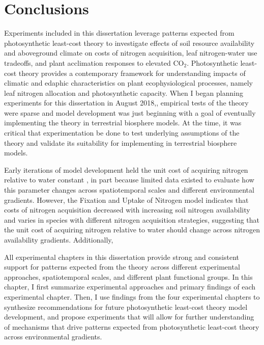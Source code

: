 \chapter{\textbf{Conclusions}}
Experiments included in this dissertation leverage patterns expected from photosynthetic least-cost theory to investigate effects of soil resource availability and aboveground climate on costs of nitrogen acquisition, leaf nitrogen-water use tradeoffs, and plant acclimation responses to elevated CO$_2$. Photosynthetic least-cost theory provides a contemporary framework for understanding impacts of climatic and edaphic characteristics on plant ecophysiological processes, namely leaf nitrogen allocation and photosynthetic capacity. When I began planning experiments for this dissertation in August 2018,, empirical tests of the theory were sparse and model development was just beginning with a goal of eventually implementing the theory in terrestrial biosphere models. At the time, it was critical that experimentation be done to test underlying assumptions of the theory and validate its suitability for implementing in terrestrial biosphere models.

Early iterations of model development held the unit cost of acquiring nitrogen relative to water constant , in part because limited data existed to evaluate how this parameter changes across spatiotemporal scales and different environmental gradients. However, the Fixation and Uptake of Nitrogen model  indicates that costs of nitrogen acquisition decreased with increasing soil nitrogen availability and varies in species with different nitrogen acquisition strategies, suggesting that the unit cost of acquiring nitrogen relative to water should change across nitrogen availability gradients. Additionally, \



All experimental chapters in this dissertation provide strong and consistent support for patterns expected from the theory across different experimental approaches, spatiotemporal scales, and different plant functional groups. In this chapter, I first summarize experimental approaches and primary findings of each experimental chapter. Then, I use findings from the four experimental chapters to synthesize recommendations for future photosynthetic least-cost theory model development, and propose experiments that will allow for further understanding of mechanisms that drive patterns expected from photosynthetic least-cost theory across environmental gradients.